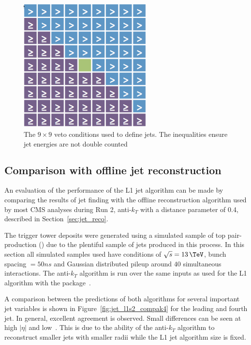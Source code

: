 \begin{figure}
\centering
    \includegraphics[width=0.6\textwidth]{./Figures/triggerUpgrade/mask.png}
  \caption{The $9\times9$ veto conditions used to define jets. The inequalities ensure
  jet energies are not double counted}
  \label{mask}
\end{figure}

\subsection{Comparison with offline jet reconstruction}

An evaluation of the performance of the L1 jet algorithm can be made by comparing
the results of jet finding with the offline reconstruction algorithm used by 
most CMS analyses during Run 2, anti-$k_T$ with a distance
parameter of 0.4, described in Section~\ref{sec:jet_reco}. 

The trigger tower deposits were generated using a simulated sample of 
top pair-production (\ttj) due to the plentiful sample of jets produced in this process. 
In this section all simulated samples used have conditions 
of $\sqrt{s} = 13\,\TeV$, bunch spacing $ = 50ns$ and Gaussian distributed pileup around $40$ simultaneous interactions. 
The anti-$k_T$ algorithm is run over the same inputs as
used for the L1 algorithm with the \FASTJET package~\cite{fastjet}.

A comparison between the predictions of both algorithms for several important jet variables is shown in 
Figure~\ref{fig:jet_l1s2_compak4} for the leading and fourth jet. In general, excellent agreement is observed. 
Small differences can be seen at high $|\eta|$ and low~\pt. This is due to the ability 
of the anti-$k_T$ algorithm to reconstruct smaller jets with smaller radii while the L1 jet
algorithm size is fixed.


